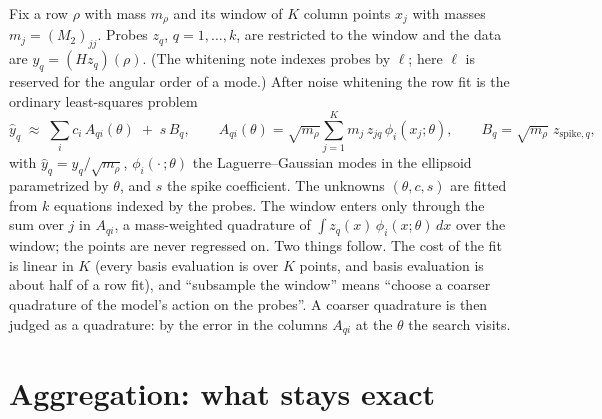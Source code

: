 \documentclass[11pt]{article}
\newcommand{\Mtwo}{M_2}
\newcommand{\what}[1]{\widehat{#1}}
\begin{document}
Fix a row $\rho$ with mass $m_\rho$ and its window of $K$ column points $x_j$
with masses $m_j = (\Mtwo)_{jj}$. Probes $z_q$, $q = 1,\dots,k$, are
restricted to the window and the data are $y_q = (Hz_q)(\rho)$. (The
whitening note indexes probes by $\ell$; here $\ell$ is reserved for the
angular order of a mode.) After noise whitening the row fit is the ordinary
least-squares problem
\begin{equation}
\what y_q \;\approx\; \sum_i c_i\, A_{qi}(\theta) \;+\; s\, B_q,
\qquad
A_{qi}(\theta) = \sqrt{m_\rho}\sum_{j=1}^{K} m_j\, z_{jq}\, \phi_i(x_j;\theta),
\qquad
B_q = \sqrt{m_\rho}\; z_{\mathrm{spike},q},
\label{eq:design}
\end{equation}
with $\what y_q = y_q/\sqrt{m_\rho}$, $\phi_i(\cdot\,;\theta)$ the
Laguerre--Gaussian modes in the ellipsoid parametrized by $\theta$, and $s$
the spike coefficient. The unknowns $(\theta, c, s)$ are fitted from $k$
equations indexed by the probes. The window enters only through the sum over
$j$ in $A_{qi}$, a mass-weighted quadrature of $\int z_q(x)\,\phi_i(x;\theta)
\,dx$ over the window; the points are never regressed on. Two things follow.
The cost of the fit is linear in $K$ (every basis evaluation is over $K$
points, and basis evaluation is about half of a row fit), and ``subsample
the window'' means ``choose a coarser quadrature of the model's action on the
probes''. A coarser quadrature is then judged as a quadrature: by the error
in the columns $A_{qi}$ at the $\theta$ the search visits.

\section{Aggregation: what stays exact}
\end{document}
